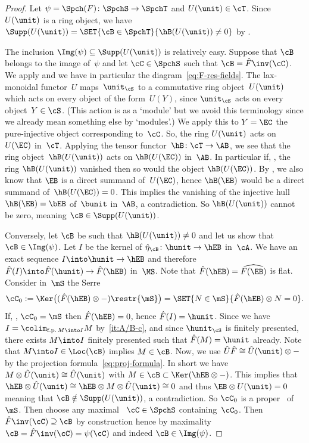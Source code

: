 \begin{proof}
Let $\psi=\Spch(F)\colon \SpchS\to \SpchT$ and $U(\unit)\in\cT$. Since $U(\unit)$ is a ring object, we have $\Supp(U(\unit))=\SET{\cB\in\SpchT}{\hB(U(\unit))\neq 0}$ by .

The inclusion $\Img(\psi)\subseteq\Supp(U(\unit))$ is relatively easy. Suppose that $\cB$ belongs to the image of~$\psi$ and let $\cC\in\SpchS$ such that $\cB=\hat F\inv(\cC)$. We apply  and we have in particular the diagram~\eqref{eq:F-res-fields}. The lax-monoidal functor~$U$ maps~$\unit_\cS$ to a commutative ring object~$U(\unit)$ which acts on every object of the form~$U(Y)$, since $\unit_\cS$ acts on every object~$Y\in\cS$. (This action is as a `module' but we avoid this terminology since we already mean something else by `modules'.) We apply this to $Y=\EC$ the pure-injective object corresponding to~$\cC$. So, the ring $U(\unit)$ acts on $U(\EC)$ in~$\cT$. Applying the tensor functor~$\hB\colon \cT\to\AB$, we see that the ring object~$\hB(U(\unit))$ acts on $\hB(U(\EC))$ in~$\AB$. In particular if, \ababs, the ring $\hB(U(\unit))$ vanished then so would the object $\hB(U(\EC))$. By , we also know that $\EB$ is a direct summand of~$U(\EC)$, hence $\hB(\EB)$ would be a direct summand of~\hbox{$\hB(U(\EC))=0$}. This implies the vanishing of the injective hull $\hB(\EB)=\bEB$ of~$\bunit$ in~$\AB$, a contradiction. So $\hB(U(\unit))$ cannot be zero, meaning $\cB\in\Supp(U(\unit))$.

Conversely, let $\cB$ be such that $\hB(U(\unit))\neq 0$ and let us show that $\cB\in\Img(\psi)$. Let $I$ be the kernel of $\hat\eta_\cB\colon \hunit\to\hEB$ in~$\cA$. We have an exact sequence $I\into \hunit \to \hEB$ and therefore $\hat F(I)\into \hat F(\hunit)\to \hat F(\hEB)$ in~$\MS$. Note that $\hat F(\hEB)=\widehat{F(\EB)}$ is flat. Consider in~$\mS$ the Serre \tensid
\[
\cC_0:=\Ker\big((\hat F(\hEB)\otimes-)\restr{\mS}\big)=\SET{N\in\mS}{\hat F(\hEB)\otimes N=0}.
\]
If, \ababs, $\cC_0=\mS$ then $\hat F(\hEB)=0$, hence $\hat F(I)=\hunit$. Since we have $I=\colim_{\text{f.p.\,}M\into I}M$ by \,\eqref{it:A/B-c}, and since $\hunit_{\cS}$ is finitely presented, there exists $M\into I$ finitely presented such that $\hat F(M)=\hunit$ already. Note that $M\into I\in\Loc(\cB)$ implies $M\in\cB$. Now, we use $\hat U\hat F\cong \hat U(\unit)\otimes-$ by the projection formula~\eqref{eq:proj-formula}. In short we have $M\otimes \hat U(\unit)\cong \hat U(\unit)$ with $M\in \cB\subset\Ker(\hEB\otimes-)$. This implies that $\hEB\otimes \hat U(\unit)\cong \hEB\otimes M\otimes \hat U(\unit)\cong 0$ and thus $\EB\otimes U(\unit)=0$ meaning that $\cB\notin\Supp(U(\unit))$, a contradiction. So $\cC_0$ is a proper \tensid\ of~$\mS$. Then choose any maximal \tensid\ $\cC\in\SpchS$ containing~$\cC_0$. Then $\hat F\inv(\cC)\supseteq\cB$ by construction hence by maximality $\cB=\hat F\inv(\cC)=\psi(\cC)$ and indeed $\cB\in\Img(\psi)$.
\end{proof}

